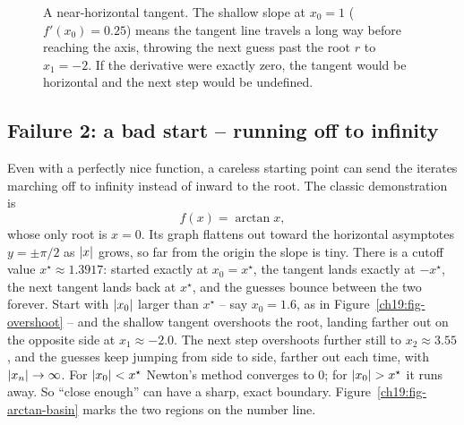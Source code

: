 \begin{figure}[H]
\centering
{}
\caption{A near-horizontal tangent. The shallow slope at $x_0=1$ ($f'(x_0)=0.25$)
means the tangent line travels a long way before reaching the axis, throwing the
next guess past the root $r$ to $x_1=-2$. If the derivative were exactly zero, the
tangent would be horizontal and the next step would be undefined.}
\label{ch19:fig-flat}
\end{figure}

\subsection{Failure 2: a bad start -- running off to infinity}

Even with a perfectly nice function, a careless starting point can send the
iterates marching off to infinity instead of inward to the root. The classic
demonstration is
\[
  f(x) = \arctan x,
\]
whose only root is $x = 0$. Its graph flattens out toward the horizontal asymptotes
$y=\pm\pi/2$ as $\lvert x\rvert$ grows, so far from the origin the slope is tiny. There is
a cutoff value $x^\star \approx 1.3917$: started exactly at $x_0 = x^\star$, the
tangent lands exactly at $-x^\star$, the next tangent lands back at $x^\star$, and
the guesses bounce between the two forever. Start with $\lvert x_0\rvert$ larger than
$x^\star$ -- say $x_0 = 1.6$, as in Figure~\ref{ch19:fig-overshoot} -- and the
shallow tangent overshoots the root, landing farther out on the opposite side at
$x_1 \approx -2.0$. The next step overshoots further still to $x_2 \approx 3.55$,
and the guesses keep jumping from side to side, farther out each time, with
$\lvert x_n\rvert \to \infty$. For $\lvert x_0\rvert < x^\star$ Newton's method converges to
$0$; for $\lvert x_0\rvert > x^\star$ it runs away. So ``close enough'' can have a sharp,
exact boundary. Figure~\ref{ch19:fig-arctan-basin} marks the two regions on the
number line.

